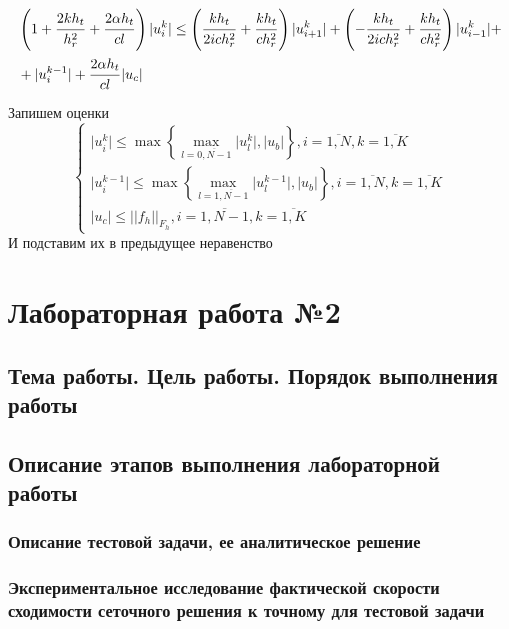 \documentclass[a4paper,12pt,russian, fleqn]{extreport}
\begin{document}
 	\begin{align}
	 	& \left(  1 + \dfrac{\strut 2 k h_t}{\strut h_r^2} + \dfrac{\strut 2 \alpha h_t}{\strut cl} \right)\lvert u^k_i \rvert \leq \left( \dfrac{\strut k h_t}{\strut 2ich_r^2} + \dfrac{\strut k h_t}{\strut c h_r^2} \right) \lvert u^k_{i+1} \rvert +\left(-\dfrac{\strut k h_t}{\strut 2ich_r^2} + \dfrac{\strut k h_t}{\strut c h_r^2}\right) \lvert u^k_{i-1} \rvert + \nonumber \\
	 	& + \lvert u_i^{k-1} \rvert + \dfrac{\strut 2\alpha h_t}{\strut cl}\lvert u_c \rvert 	\nonumber	
 	\end{align}
 	Запишем оценки
	\begin{equation}
		\left\{
		\begin{array}{l}
			\vert u_i^k \vert \leq \max\left\{\max\limits_{l = \overline{0, N-1}}\lvert u_l^k \rvert, \lvert u_b \rvert \right\}, i =\overline{1, N}, k = \overline{1, K} \\
			\vert u_i^{k-1} \vert \leq \max\left\{\max\limits_{l = \overline{1, N-1}}\lvert u_l^{k-1} \rvert, \lvert u_b \rvert \right\}, i =\overline{1, N}, k = \overline{1, K} \\
			\lvert u_c \rvert \leq \vert\vert f_h \vert\vert_{F_h}, i = \overline{1, N-1}, k = \overline{1,K}
		\end{array}
		\right.
	\end{equation}
	И подставим их в предыдущее неравенство
	\chapter{Лабораторная работа №2}
	\section{Тема работы. Цель работы. Порядок выполнения работы}
	\section{Описание этапов выполнения лабораторной работы}
	\subsection{Описание тестовой задачи, ее аналитическое решение}
	\subsection{Экспериментальное исследование фактической скорости сходимости сеточного решения к точному для тестовой задачи}
\end{document}
